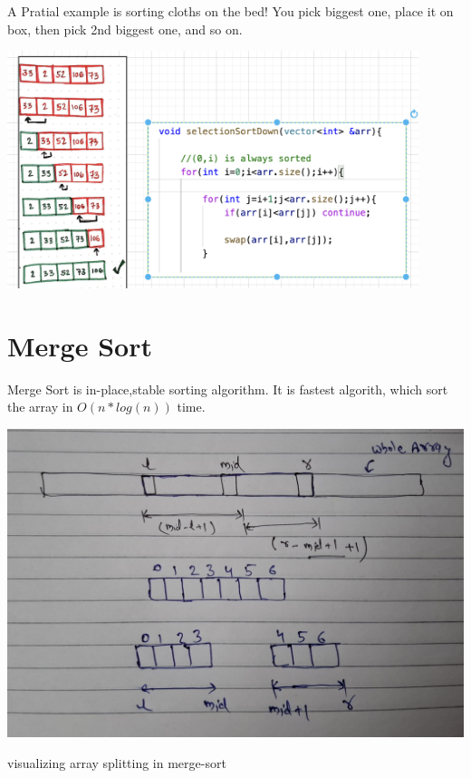  A Pratial example is sorting cloths on the bed! You pick biggest one, place it on box, then pick 2nd biggest one, and so on.
 
 \includegraphics[width=12cm]{resources/sorting-selection-sort.png}

 \section{Merge Sort}
 Merge Sort is in-place,stable sorting algorithm. It is fastest algorith, which sort the array in $O(n*log(n))$ time.


 \begin{marginfigure}
    


     \includegraphics[width=\marginparwidth]{resources/sorting-merge-sort-division.jpg}
     \caption{visualizing array splitting in merge-sort}

 \end{marginfigure}

